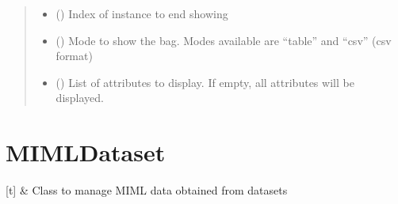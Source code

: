 \documentclass[letterpaper,10pt,english]{sphinxmanual}
\begin{document}
\begin{fulllineitems}
\begin{fulllineitems}
\begin{quote}
\begin{description}
\begin{itemize}
\item {} 
\sphinxAtStartPar
{} () \textendash{} Index of instance to end showing

\item {} 
\sphinxAtStartPar
{} () \textendash{} Mode to show the bag. Modes available are “table” and “csv” (csv format)

\item {} 
\sphinxAtStartPar
{} (\sphinxstyleliteralemphasis{\sphinxupquote{{[}}}\sphinxstyleliteralemphasis{\sphinxupquote{{]}}}) \textendash{} List of attributes to display. If empty, all attributes will be displayed.

\end{itemize}

\end{description}\end{quote}

\end{fulllineitems}


\end{fulllineitems}


\sphinxstepscope


\section{MIMLDataset}
\label{\detokenize{data/miml_dataset:mimldataset}}\label{\detokenize{data/miml_dataset::doc}}

\begin{savenotes}\sphinxattablestart
\sphinxthistablewithglobalstyle
\sphinxthistablewithnovlinesstyle
\centering
\begin{tabulary}{\linewidth}[t]{}
\sphinxtoprule
\sphinxtableatstartofbodyhook
\sphinxAtStartPar
{\hyperref[\detokenize{data/_autosummary/miml.data.miml_dataset.MIMLDataset:miml.data.miml_dataset.MIMLDataset}]{}}
&
\sphinxAtStartPar
Class to manage MIML data obtained from datasets
\\
\sphinxbottomrule
\end{tabulary}
\sphinxtableafterendhook\par
\sphinxattableend\end{savenotes}
\end{document}
